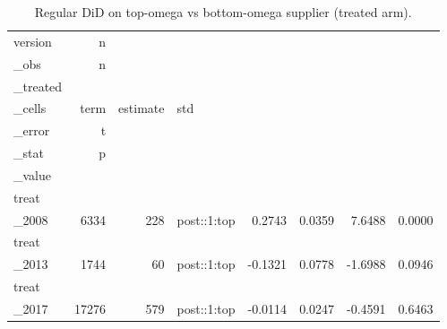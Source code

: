 \begin{table}[ht]
\centering
\caption{Regular DiD on top-omega vs bottom-omega supplier (treated arm).} 
\begin{tabular}{lrrlrrrr}
  \toprule
version & n\\_obs & n\\_treated\\_cells & term & estimate & std\\_error & t\\_stat & p\\_value \\ 
  \midrule
treat\\_2008 &  6334 &   228 & post::1:top & 0.2743 & 0.0359 & 7.6488 & 0.0000 \\ 
  treat\\_2013 &  1744 &    60 & post::1:top & -0.1321 & 0.0778 & -1.6988 & 0.0946 \\ 
  treat\\_2017 & 17276 &   579 & post::1:top & -0.0114 & 0.0247 & -0.4591 & 0.6463 \\ 
   \bottomrule
\end{tabular}
\end{table}
